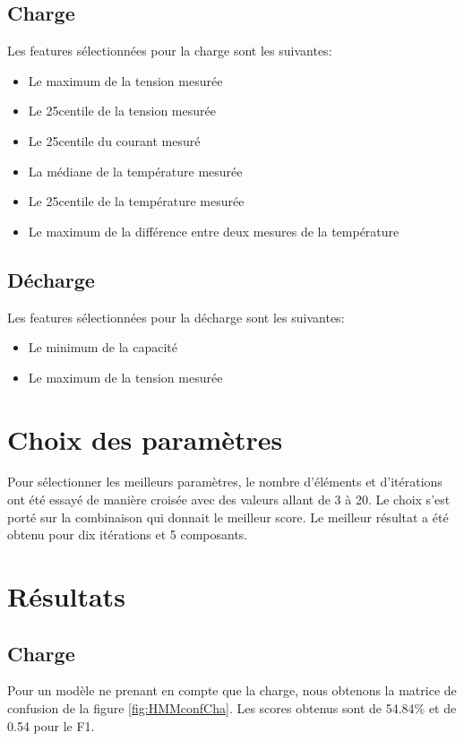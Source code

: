 \subsection{Charge}
Les features sélectionnées pour la charge sont les suivantes:

\begin{itemize}
    \item Le maximum de la tension mesurée
    \item Le 25\ieme centile de la tension mesurée
    \item Le 25\ieme centile du courant mesuré
    \item La médiane de la température mesurée
    \item Le 25\ieme centile de la température mesurée
    \item Le maximum de la différence entre deux mesures de la température
\end{itemize}

\subsection{Décharge}
Les features sélectionnées pour la décharge sont les suivantes:
\begin{itemize}
    \item Le minimum de la capacité
    \item Le maximum de la tension mesurée
\end{itemize}

\section{Choix des paramètres}
Pour sélectionner les meilleurs paramètres, le nombre d'éléments et d'itérations ont été essayé de manière croisée avec des valeurs allant de 3 à 20.
Le choix s'est porté sur la combinaison qui donnait le meilleur score.
Le meilleur résultat a été obtenu pour dix itérations et 5 composants.

\section{Résultats}
\subsection{Charge}
Pour un modèle ne prenant en compte que la charge, nous obtenons la matrice de confusion de la figure \ref{fig:HMMconfCha}. Les scores obtenus sont de 54.84\% et de 0.54 pour le F1.

